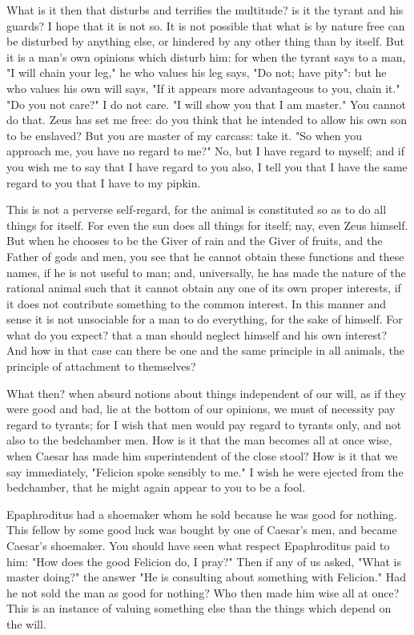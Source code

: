 \documentclass[a4paper]{article}
\begin{document}
What is it then that disturbs and terrifies the multitude? is it the
tyrant and his guards? I hope that it is not so. It is not possible
that what is by nature free can be disturbed by anything else, or
hindered by any other thing than by itself. But it is a man's own
opinions which disturb him: for when the tyrant says to a man, "I
will chain your leg," he who values his leg says, "Do not; have pity":
but he who values his own will says, "If it appears more advantageous
to you, chain it." "Do you not care?" I do not care. "I will show
you that I am master." You cannot do that. Zeus has set me free: do
you think that he intended to allow his own son to be enslaved? But
you are master of my carcass: take it. "So when you approach me, you
have no regard to me?" No, but I have regard to myself; and if you
wish me to say that I have regard to you also, I tell you that I have
the same regard to you that I have to my pipkin. 

This is not a perverse self-regard, for the animal is constituted
so as to do all things for itself. For even the sun does all things
for itself; nay, even Zeus himself. But when he chooses to be the
Giver of rain and the Giver of fruits, and the Father of gods and
men, you see that he cannot obtain these functions and these names,
if he is not useful to man; and, universally, he has made the nature
of the rational animal such that it cannot obtain any one of its own
proper interests, if it does not contribute something to the common
interest. In this manner and sense it is not unsociable for a man
to do everything, for the sake of himself. For what do you expect?
that a man should neglect himself and his own interest? And how in
that case can there be one and the same principle in all animals,
the principle of attachment to themselves? 

What then? when absurd notions about things independent of our will,
as if they were good and bad, lie at the bottom of our opinions, we
must of necessity pay regard to tyrants; for I wish that men would
pay regard to tyrants only, and not also to the bedchamber men. How
is it that the man becomes all at once wise, when Caesar has made
him superintendent of the close stool? How is it that we say immediately,
"Felicion spoke sensibly to me." I wish he were ejected from the bedchamber,
that he might again appear to you to be a fool. 

Epaphroditus had a shoemaker whom he sold because he was good for
nothing. This fellow by some good luck was bought by one of Caesar's
men, and became Caesar's shoemaker. You should have seen what respect
Epaphroditus paid to him: "How does the good Felicion do, I pray?"
Then if any of us asked, "What is master doing?" the answer "He is
consulting about something with Felicion." Had he not sold the man
as good for nothing? Who then made him wise all at once? This is an
instance of valuing something else than the things which depend on
the will. 
\end{document}

